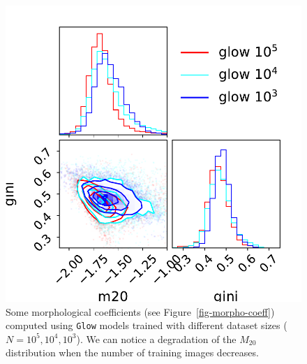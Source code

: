 \documentclass[fleqn,usenatbib]{mnras}
\begin{document}
\begin{figure}
    \centering
	\includegraphics[width=0.7\linewidth]{fig-gini-m20-glow-compare_0.pdf}
	\caption{Some morphological coefficients (see Figure~\ref{fig-morpho-coeff}) computed using \texttt{Glow} models trained with different dataset sizes ($N=10^5, 10^4, 10^3$). We can notice a degradation of the $M_{20}$ distribution when the number of training images decreases.}
	\label{fig-morpho-coeff-glow-comparison}
\end{figure}
%
\end{document}
